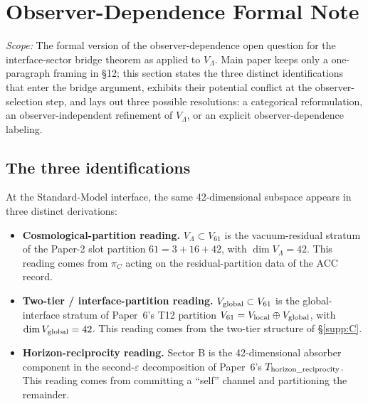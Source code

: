 \documentclass[11pt]{article}
\theoremstyle{plain}
\theoremstyle{definition}
\theoremstyle{remark}
\begin{document}
\section{Observer-Dependence Formal Note}\label{supp:K}

\noindent\textit{Scope:} The formal version of the observer-dependence open question for the interface-sector bridge theorem as applied to $V_\Lambda$.  Main paper keeps only a one-paragraph framing in \S12; this section states the three distinct identifications that enter the bridge argument, exhibits their potential conflict at the observer-selection step, and lays out three possible resolutions: a categorical reformulation, an observer-independent refinement of $V_\Lambda$, or an explicit observer-dependence labeling.

\bigskip

\subsection{The three identifications}\label{supp:K1}

At the Standard-Model interface, the same 42-dimensional subspace appears in three distinct derivations:

\begin{itemize}[leftmargin=2em,itemsep=3pt]
  \item[\textbf{(K.i)}]  \textbf{Cosmological-partition reading.}  $V_\Lambda \subset V_{61}$ is the vacuum-residual stratum of the Paper-2 slot partition $61 = 3 + 16 + 42$, with $\dim V_\Lambda = 42$.  This reading comes from $\pi_C$ acting on the residual-partition data of the ACC record.
  \item[\textbf{(K.ii)}]  \textbf{Two-tier / interface-partition reading.}  $V_{\rm global} \subset V_{61}$ is the global-interface stratum of Paper~6's T12 partition $V_{61} = V_{\rm local} \oplus V_{\rm global}$, with $\dim V_{\rm global} = 42$.  This reading comes from the two-tier structure of \S\ref{supp:C}.
  \item[\textbf{(K.iii)}]  \textbf{Horizon-reciprocity reading.}  Sector B is the 42-dimensional absorber component in the second-$\varepsilon$ decomposition of Paper~6's $T_{\rm horizon\_reciprocity}$.  This reading comes from committing a ``self'' channel and partitioning the remainder.
\end{itemize}
\end{document}
